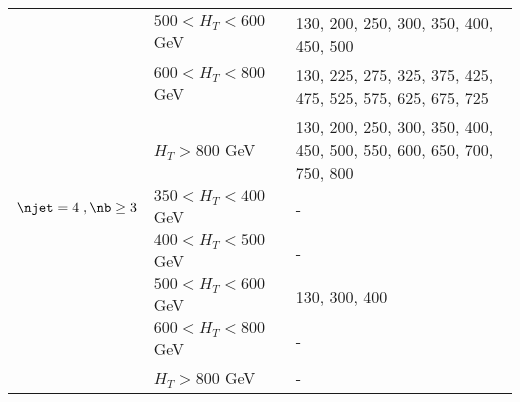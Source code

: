 \begin{table}[h!]
\begin{tabular}{ lll }
     & $500 < H_{T} < 600$ GeV & 130, 200, 250, 300, 350, 400, 450, 500 \\ 
     & $600 < H_{T} < 800$ GeV & 130, 225, 275, 325, 375, 425, 475, 525, 575, 625, 675, 725 \\ 
     & $H_{T} > 800$ GeV & 130, 200, 250, 300, 350, 400, 450, 500, 550, 600, 650, 700, 750, 800 \\ 
    \hline
    $\njet = 4 \;, \nb \geq 3$ & $350 < H_{T} < 400$ GeV & - \\ 
     & $400 < H_{T} < 500$ GeV & - \\ 
     & $500 < H_{T} < 600$ GeV & 130, 300, 400 \\ 
     & $600 < H_{T} < 800$ GeV & - \\ 
     & $H_{T} > 800$ GeV & - \\ 

  \end{tabular}
\end{table}



